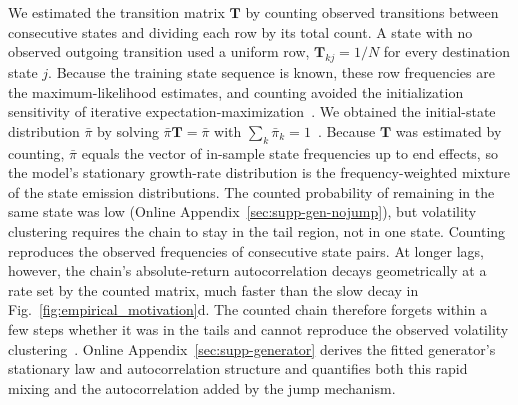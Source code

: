 We estimated the transition matrix $\mathbf{T}$ by counting observed
transitions between consecutive states and dividing each row by its
total count. A state with no observed outgoing transition used a
uniform row, $\mathbf{T}_{kj}=1/N$ for every destination state $j$.
Because the training state sequence is known, these row frequencies
are the maximum-likelihood estimates, and counting avoided the
initialization sensitivity of iterative
expectation-maximization~\cite{bilmes1998}. We obtained the
initial-state distribution $\bar{\pi}$ by solving
$\bar{\pi}\mathbf{T}=\bar{\pi}$ with
$\sum_k\bar{\pi}_k=1$~\cite{hamilton2018regime, grinsteadSnell1997}.
Because $\mathbf{T}$ was estimated by counting, $\bar{\pi}$ equals
the vector of in-sample state frequencies up to end effects, so the
model's stationary growth-rate distribution is the
frequency-weighted mixture of the state emission distributions. The counted probability of remaining in the same state was low
(Online Appendix~\ref{sec:supp-gen-nojump}), but volatility clustering
requires the chain to stay in the tail region, not in one state. Counting reproduces the observed
frequencies of consecutive state pairs. At longer lags, however, the
chain's absolute-return autocorrelation decays geometrically at a rate
set by the counted matrix, much faster than the slow decay in
Fig.~\ref{fig:empirical_motivation}d. The counted chain therefore
forgets within a few steps whether it was in the tails and cannot
reproduce the observed volatility clustering~\cite{bullaBulla2006}. Online
Appendix~\ref{sec:supp-generator} derives the fitted generator's
stationary law and autocorrelation structure and quantifies both this
rapid mixing and the autocorrelation added by the jump mechanism.

